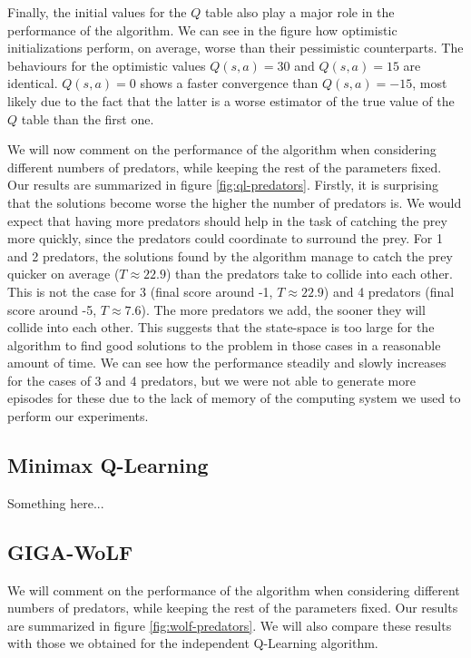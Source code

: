 \documentclass[a4paper,12pt]{article}
\begin{document}
Finally, the initial values for the $Q$ table also play a major role in the performance of the algorithm. We can see in the figure how optimistic initializations perform, on average, worse than their pessimistic counterparts. The behaviours for the optimistic values $Q(s, a) = 30 $ and $Q(s, a) = 15 $ are identical. $Q(s, a) = 0 $ shows a faster convergence than $Q(s, a) = -15 $, most likely due to the fact that the latter is a worse estimator of the true value of the $Q$ table than the first one.

We will now comment on the performance of the algorithm when considering different numbers of predators, while keeping the rest of the parameters fixed. Our results are summarized in figure \ref{fig:ql-predators}. Firstly, it is surprising that the solutions become worse the higher the number of predators is. We would expect that having more predators should help in the task of catching the prey more quickly, since the predators could coordinate to surround the prey. For 1 and 2 predators, the solutions found by the algorithm manage to catch the prey quicker on average ($ T \approx 22.9 $) than the predators take to collide into each other. This is not the case for 3 (final score around -1, $ T \approx 22.9 $) and 4 predators (final score around -5, $ T \approx 7.6 $). The more predators we add, the sooner they will collide into each other. This suggests that the state-space is too large for the algorithm to find good solutions to the problem in those cases in a reasonable amount of time. We can see how the performance steadily and slowly increases for the cases of 3 and 4 predators, but we were not able to generate more episodes for these due to the lack of memory of the computing system we used to perform our experiments.

\subsection{Minimax Q-Learning}

Something here...

\subsection{GIGA-WoLF}

We will comment on the performance of the algorithm when considering different numbers of predators, while keeping the rest of the parameters fixed. Our results are summarized in figure \ref{fig:wolf-predators}. We will also compare these results with those we obtained for the independent Q-Learning algorithm.
\end{document}

